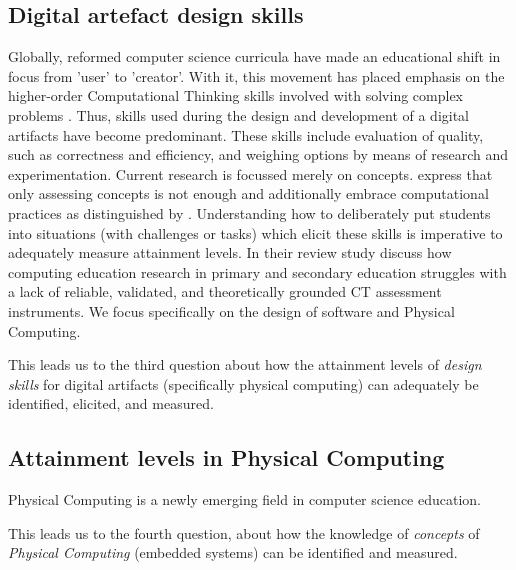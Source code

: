\subsection*{Digital artefact design skills}
Globally, reformed computer science curricula have made an educational shift in focus from 'user' to 'creator'. With it, this movement has placed emphasis on the higher-order Computational Thinking skills involved with solving complex problems \cite{Wing2006}. Thus, skills used during the design and development of a digital artifacts have become predominant. These skills include evaluation of quality, such as correctness and efficiency, and weighing options by means of research and experimentation. Current research is focussed merely on concepts.  express that only assessing concepts is not enough and additionally embrace computational practices as distinguished by \citeauthor{BrennanResnick2012}. Understanding how to deliberately put students into situations (with challenges or tasks) which elicit these skills is imperative to adequately measure attainment levels. In their review study  discuss how computing education research in primary and secondary education struggles with a lack of reliable, validated, and theoretically grounded CT assessment instruments. We focus specifically on the design of software and Physical Computing.

This leads us to the third question about how the attainment levels of \emph{design skills} for digital artifacts (specifically physical computing) can adequately be identified, elicited, and measured.



\subsection*{Attainment levels in Physical Computing}
Physical Computing is a newly emerging field in computer science education.

This leads us to the fourth question, about how the knowledge of \emph{concepts} of \emph{Physical Computing} (embedded systems) can be identified and measured.




